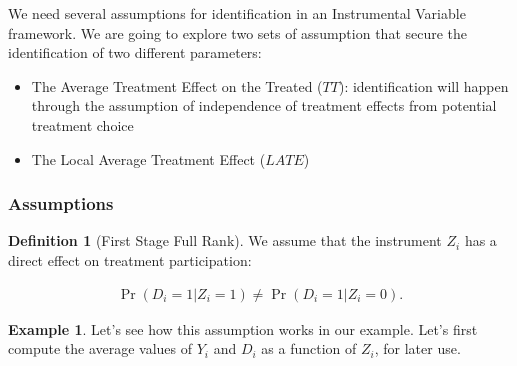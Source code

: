 \documentclass[
]{book}
\providecommand{\tightlist}{%
  \setlength{\itemsep}{0pt}\setlength{\parskip}{0pt}}
\theoremstyle{definition}
\newtheorem{definition}{Definition}[chapter]
\theoremstyle{definition}
\newtheorem{example}{Example}[chapter]
\theoremstyle{definition}
\theoremstyle{definition}
\theoremstyle{remark}
\begin{document}
We need several assumptions for identification in an Instrumental Variable framework.
We are going to explore two sets of assumption that secure the identification of two different parameters:

\begin{itemize}
\tightlist
\item
  The Average Treatment Effect on the Treated (\(TT\)): identification will happen through the assumption of independence of treatment effects from potential treatment choice
\item
  The Local Average Treatment Effect (\(LATE\))
\end{itemize}

\hypertarget{assumptions}{%
\subsubsection{Assumptions}\label{assumptions}}

\begin{definition}[First Stage Full Rank]
\protect\hypertarget{def:FirstStage}{}{\label{def:FirstStage} \iffalse (First Stage Full Rank) \fi{} }We assume that the instrument \(Z_i\) has a direct effect on treatment participation:

\begin{align*}
\Pr(D_i=1|Z_i=1)\neq\Pr(D_i=1|Z_i=0).
\end{align*}
\end{definition}

\begin{example}
\protect\hypertarget{exm:unnamed-chunk-140}{}{\label{exm:unnamed-chunk-140} }Let's see how this assumption works in our example.
Let's first compute the average values of \(Y_i\) and \(D_i\) as a function of \(Z_i\), for later use.
\end{example}
\end{document}
